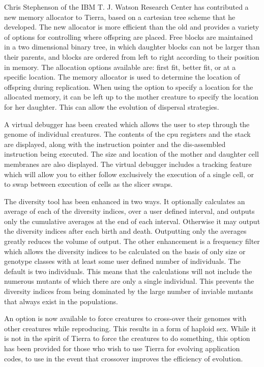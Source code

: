 Chris Stephenson of the IBM T. J. Watson Research Center has contributed a new
memory allocator to Tierra, based on a cartesian tree scheme that he developed.
The new allocator is more efficient than the old and provides a variety of
options for controlling where offspring are placed.  Free blocks are maintained
in a two dimensional binary tree, in which daughter blocks can not be larger
than their parents, and blocks are ordered from left to right according to
their position in memory.  The allocation options available are: first fit,
better fit, or at a specific location.  The memory allocator is used to
determine the location of offspring during replication.  When using the option
to specify a location for the allocated memory, it can be left up to the
mother creature to specify the location for her daughter.  This can allow the
evolution of dispersal strategies. 

A virtual debugger has been created which allows the user to step through
the genome of individual creatures.  The contents of the cpu registers and
the stack are displayed, along with the instruction pointer and the
dis-assembled instruction being executed.  The size and location of the
mother and daughter cell membranes are also displayed.  The virtual debugger
includes a tracking feature which will allow you to either follow exclusively
the execution of a single cell, or to swap between execution of cells as the
slicer swaps.

The diversity tool has been enhanced in two ways.  It optionally
calculates an average of each of the diversity indices, over a user defined
interval, and outputs only the cumulative averages at the end of each
interval.  Otherwise it may output the diversity indices after each birth
and death.  Outputting only the averages greatly reduces the volume of output.
The other enhancement is a frequency filter which allows the diversity
indices to be calculated on the basis of only size or genotype classes with
at least some user defined number of individuals.  The default is two
individuals.  This means that the calculations will not include the numerous
mutants of which there are only a single individual.  This prevents the
diversity indices from being dominated by the large number of inviable
mutants that always exist in the populations.

An option is now available to force creatures to cross-over their genomes
with other creatures while reproducing.  This results in a form of haploid
sex.  While it is not in the spirit of Tierra to force the creatures to
do something, this option has been provided for those who wish to use Tierra
for evolving application codes, to use in the event that crossover improves
the efficiency of evolution.

